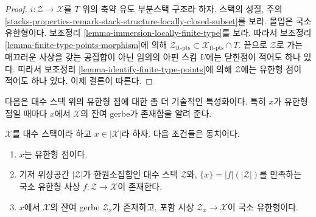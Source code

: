 \begin{proof}
$i : \mathcal{Z} \to \mathcal{X}$를 $T$ 위의 축약 유도 부분스택 구조라
하자. 스택의 성질,
주의 \ref{stacks-properties-remark-stack-structure-locally-closed-subset}를
보라. 몰입은 국소 유한형이다. 보조정리
\ref{lemma-immersion-locally-finite-type}를 보라. 따라서
보조정리 \ref{lemma-finite-type-points-morphism}에 의해
$\mathcal{Z}_{\text{ft-pts}} \subset \mathcal{X}_{\text{ft-pts}} \cap T$.
끝으로 $\mathcal{Z}$로 가는 매끄러운 사상을 갖는 공집합이 아닌
임의의 아핀 스킴 $U$에는 닫힌점이 적어도 하나 있다. 따라서
보조정리 \ref{lemma-identify-finite-type-points}에 의해
$\mathcal{Z}$에는 유한형 점이 적어도 하나 있다. 이제 결론이 따른다.
\end{proof}

\noindent
다음은 대수 스택 위의 유한형 점에 대한 좀 더 기술적인 특성화이다.
특히 $x$가 유한형 점일 때마다 $x$에서 $\mathcal{X}$의 잔여 gerbe가
존재함을 알려 준다.

\begin{lemma}
\label{lemma-point-finite-type-monomorphism}
$\mathcal{X}$를 대수 스택이라 하고 $x \in |\mathcal{X}|$라 하자.
다음 조건들은 동치이다.
\begin{enumerate}
\item $x$는 유한형 점이다.
\item 기저 위상공간 $|\mathcal{Z}|$가 한원소집합인 대수 스택
$\mathcal{Z}$와, $\{x\} = |f|(|\mathcal{Z}|)$를 만족하는 국소 유한형
사상 $f : \mathcal{Z} \to \mathcal{X}$이 존재한다.
\item $x$에서 $\mathcal{X}$의 잔여 gerbe $\mathcal{Z}_x$가 존재하고,
포함 사상 $\mathcal{Z}_x \to \mathcal{X}$이 국소 유한형이다.
\end{enumerate}
\end{lemma}

